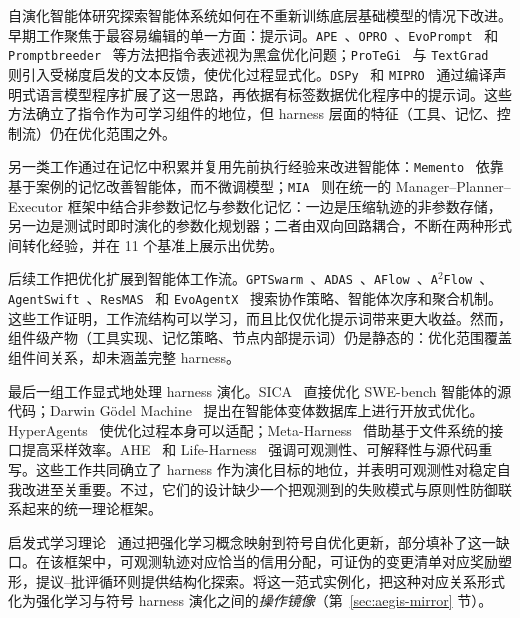 自演化智能体研究探索智能体系统如何在不重新训练底层基础模型的情况下改进。早期工作聚焦于最容易编辑的单一方面：提示词。\texttt{APE}~\cite{zhou2022large}、\texttt{OPRO}~\cite{yang2024large}、\texttt{EvoPrompt}~\cite{guo2024connecting} 和 \texttt{Promptbreeder}~\cite{fernando2024promptbreeder} 等方法把指令表述视为黑盒优化问题；\texttt{ProTeGi}~\cite{pryzant2023automatic} 与 \texttt{TextGrad}~\cite{yuksekgonul2024textgrad} 则引入受梯度启发的文本反馈，使优化过程显式化。\texttt{DSPy}~\cite{khattab2023dspy} 和 \texttt{MIPRO}~\cite{opsahl2024optimizing} 通过编译声明式语言模型程序扩展了这一思路，再依据有标签数据优化程序中的提示词。这些方法确立了指令作为可学习组件的地位，但 harness 层面的特征（工具、记忆、控制流）仍在优化范围之外。

另一类工作通过在记忆中积累并复用先前执行经验来改进智能体：\texttt{Memento}~\cite{zhou2025memento} 依靠基于案例的记忆改善智能体，而不微调模型；\texttt{MIA}~\cite{qiao2026memory} 则在统一的 Manager--Planner--Executor 框架中结合非参数记忆与参数化记忆：一边是压缩轨迹的非参数存储，另一边是测试时即时演化的参数化规划器；二者由双向回路耦合，不断在两种形式间转化经验，并在 11 个基准上展示出优势。

后续工作把优化扩展到智能体工作流。\texttt{GPTSwarm}~\cite{zhuge2024gptswarm}、\texttt{ADAS}~\cite{hu2025automated}、\texttt{AFlow}~\cite{zhang2025aflow}、\texttt{A$^2$Flow}~\cite{zhao2026a2flow}、\texttt{AgentSwift}~\cite{li2026agentswift}、\texttt{ResMAS}~\cite{zhou2026resmas} 和 \texttt{EvoAgentX}~\cite{wang2025evoagentx} 搜索协作策略、智能体次序和聚合机制。这些工作证明，工作流结构可以学习，而且比仅优化提示词带来更大收益。然而，组件级产物（工具实现、记忆策略、节点内部提示词）仍是静态的：优化范围覆盖组件间关系，却未涵盖完整 harness。

最后一组工作显式地处理 harness 演化。SICA~\cite{robeyns2025self} 直接优化 SWE-bench 智能体的源代码；Darwin G\"odel Machine~\cite{lange2025darwin} 提出在智能体变体数据库上进行开放式优化。HyperAgents~\cite{zhang2026hyperagents} 使优化过程本身可以适配；Meta-Harness~\cite{lee2026meta} 借助基于文件系统的接口提高采样效率。AHE~\cite{lin2026agentic} 和 Life-Harness~\cite{xu2026adapting} 强调可观测性、可解释性与源代码重写。这些工作共同确立了 harness 作为演化目标的地位，并表明可观测性对稳定自我改进至关重要。不过，它们的设计缺少一个把观测到的失败模式与原则性防御联系起来的统一理论框架。

启发式学习理论~\cite{weng2026learning_beyond_gradients} 通过把强化学习概念映射到符号自优化更新，部分填补了这一缺口。在该框架中，可观测轨迹对应恰当的信用分配，可证伪的变更清单对应奖励塑形，提议--批评循环则提供结构化探索。\ProjectName 将这一范式实例化，把这种对应关系形式化为强化学习与符号 harness 演化之间的\textit{操作镜像}（第~\ref{sec:aegis-mirror} 节）。
